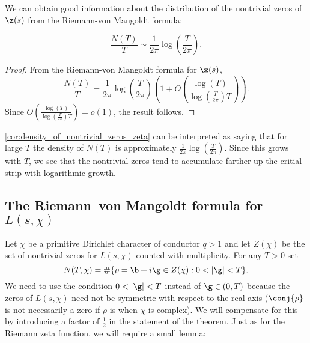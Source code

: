       We can obtain good information about the distribution of the nontrivial zeros of $\z(s)$ from the Riemann-von Mangoldt formula:

      \begin{corollary}\label{cor:density_of_nontrivial_zeros_zeta}
        \phantom{ }
        \[
          \frac{N(T)}{T} \sim \frac{1}{2\pi}\log\left(\frac{T}{2\pi}\right).
        \]
      \end{corollary}
      \begin{proof}
        From the Riemann-von Mangoldt formula for $\z(s)$,
        \[
          \frac{N(T)}{T} = \frac{1}{2\pi}\log\left(\frac{T}{2\pi}\right)\left(1+O\left(\frac{\log(T)}{\log\left(\frac{T}{2\pi}\right)T}\right)\right).
        \]
        Since $O\left(\frac{\log(T)}{\log\left(\frac{T}{2\pi}\right)T}\right) = o(1)$, the result follows.
      \end{proof}

      \cref{cor:density_of_nontrivial_zeros_zeta} can be interpreted as saying that for large $T$ the density of $N(T)$ is approximately $\frac{1}{2\pi}\log\left(\frac{T}{2\pi}\right)$. Since this grows with $T$, we see that the nontrivial zeros tend to accumulate farther up the critial strip with logarithmic growth.
    \subsection*{The Riemann–von Mangoldt formula for $L(s,\chi)$}
      Let $\chi$ be a primitive Dirichlet character of conductor $q > 1$ and let $Z(\chi)$ be the set of nontrivial zeros for $L(s,\chi)$ counted with multiplicity. For any $T > 0$ set
      \[
        N(T,\chi) = \#\{\rho = \b+i\g \in Z(\chi):0 < |\g| < T\}.
      \]
      We need to use the condition $0 < |\g| < T$ instead of $\g \in (0,T)$ because the zeros of $L(s,\chi)$ need not be symmetric with respect to the real axis ($\conj{\rho}$ is not necessarily a zero if $\rho$ is when $\chi$ is complex). We will compensate for this by introducing a factor of $\frac{1}{2}$ in the statement of the theorem. Just as for the Riemann zeta function, we will require a small lemma:

